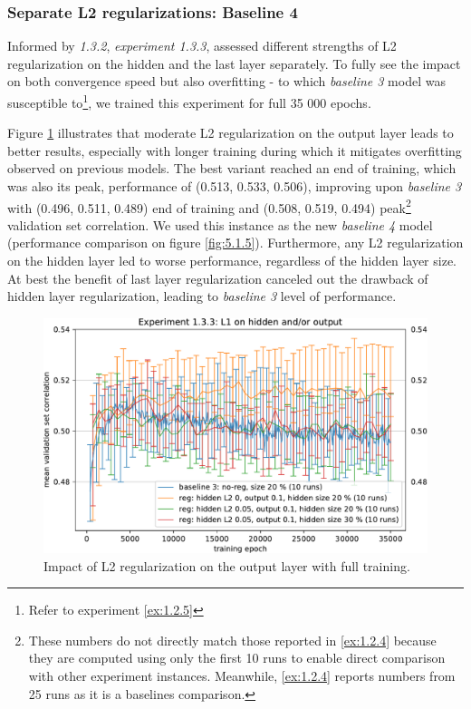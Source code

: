 \subsubsection{Separate L2 regularizations: Baseline 4}\label{ex:1.3.3}

Informed by \textit{1.3.2}, \textit{experiment 1.3.3}, assessed different strengths of L2 regularization on the hidden and the last layer separately. To fully see the impact on both convergence speed but also overfitting - to which \textit{baseline 3} model was susceptible to\footnote{Refer to experiment \ref{ex:1.2.5}}, we trained this experiment for full 35 000 epochs.

Figure \ref{fig:5.1.3.3} illustrates that moderate L2 regularization on the output layer leads to better results, especially with longer training during which it mitigates overfitting observed on previous models. The best variant reached an end of training, which was also its peak, performance of (0.513, 0.533, 0.506), improving upon \textit{baseline 3} with (0.496, 0.511, 0.489) end of training and (0.508, 0.519, 0.494) peak\footnote{These numbers do not directly match those reported in \ref{ex:1.2.4} because they are computed using only the first 10 runs to enable direct comparison with other experiment instances. Meanwhile, \ref{ex:1.2.4} reports numbers from 25 runs as it is a baselines comparison.} validation set correlation. We used this instance as the new \textit{baseline 4} model (performance comparison on figure \ref{fig:5.1.5}). Furthermore, any L2 regularization on the hidden layer led to worse performance, regardless of the hidden layer size. At best the benefit of last layer regularization canceled out the drawback of hidden layer regularization, leading to \textit{baseline 3} level of performance.

\begin{figure}[H]
    \centering
    \includegraphics[width=1\textwidth]{../figures/05_1_3_3}
    \caption[Experiment 1.3.3]{Impact of L2 regularization on the output layer with full training.}
    \label{fig:5.1.3.3}
\end{figure}

